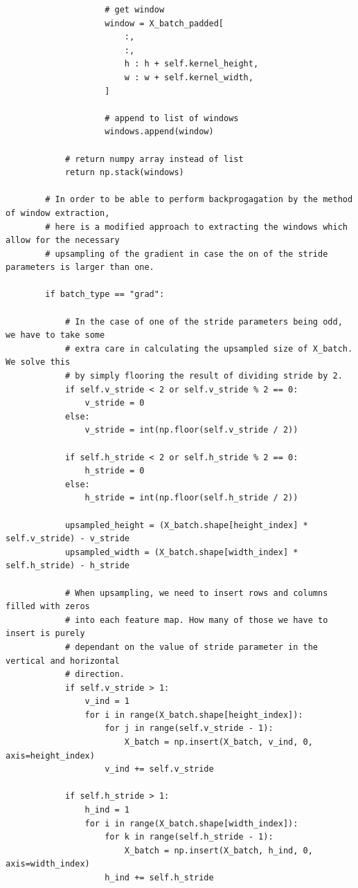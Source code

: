 \documentclass[%
oneside,                 %
final,                   %
10pt]{article}
\begin{document}
\begin{verbatim}
                    # get window
                    window = X_batch_padded[
                        :,
                        :,
                        h : h + self.kernel_height,
                        w : w + self.kernel_width,
                    ]

                    # append to list of windows
                    windows.append(window)

            # return numpy array instead of list
            return np.stack(windows)

        # In order to be able to perform backprogagation by the method of window extraction,
        # here is a modified approach to extracting the windows which allow for the necessary
        # upsampling of the gradient in case the on of the stride parameters is larger than one.

        if batch_type == "grad":

            # In the case of one of the stride parameters being odd, we have to take some
            # extra care in calculating the upsampled size of X_batch. We solve this
            # by simply flooring the result of dividing stride by 2.
            if self.v_stride < 2 or self.v_stride % 2 == 0:
                v_stride = 0
            else:
                v_stride = int(np.floor(self.v_stride / 2))

            if self.h_stride < 2 or self.h_stride % 2 == 0:
                h_stride = 0
            else:
                h_stride = int(np.floor(self.h_stride / 2))

            upsampled_height = (X_batch.shape[height_index] * self.v_stride) - v_stride
            upsampled_width = (X_batch.shape[width_index] * self.h_stride) - h_stride

            # When upsampling, we need to insert rows and columns filled with zeros
            # into each feature map. How many of those we have to insert is purely
            # dependant on the value of stride parameter in the vertical and horizontal
            # direction.
            if self.v_stride > 1:
                v_ind = 1
                for i in range(X_batch.shape[height_index]):
                    for j in range(self.v_stride - 1):
                        X_batch = np.insert(X_batch, v_ind, 0, axis=height_index)
                    v_ind += self.v_stride

            if self.h_stride > 1:
                h_ind = 1
                for i in range(X_batch.shape[width_index]):
                    for k in range(self.h_stride - 1):
                        X_batch = np.insert(X_batch, h_ind, 0, axis=width_index)
                    h_ind += self.h_stride


\end{verbatim}
\end{document}
